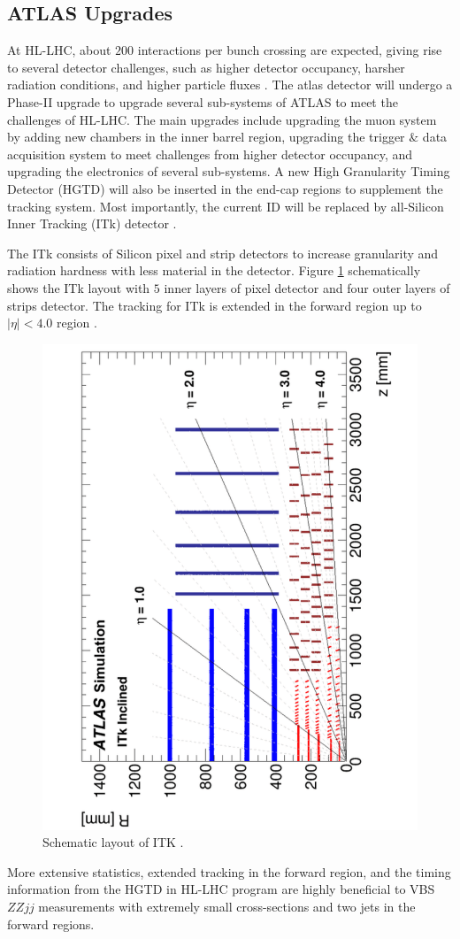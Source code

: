\subsection{ATLAS Upgrades}
\label{subsec:ATLASUpgrade}
At HL-LHC, about $200$ interactions per bunch crossing are expected, giving rise to several detector challenges, such as higher detector occupancy, harsher radiation conditions, and higher particle fluxes \cite{HLLHC}. The atlas detector will undergo a Phase-II upgrade to upgrade several sub-systems of ATLAS to meet the challenges of HL-LHC. The main upgrades include upgrading the muon system by adding new chambers in the inner barrel region, upgrading the trigger $\&$ data acquisition system to meet challenges from higher detector occupancy, and upgrading the electronics of several sub-systems. A new High Granularity Timing Detector (HGTD) will also be inserted in the end-cap regions to supplement the tracking system. Most importantly, the current ID will be replaced by all-Silicon Inner Tracking (ITk) detector \cite{HLLHC}.

The ITk consists of Silicon pixel and strip detectors to increase granularity and radiation hardness with less material in the detector. Figure \ref{fig:ITKLayout} schematically shows the ITk layout with $5$ inner layers of pixel detector and four outer layers of strips detector. The tracking for ITk is extended in the forward region up to $|\eta| < 4.0$ region \cite{ITkStripsTDR}. 

\begin{figure}[!htb]
    \centering
    \includegraphics[angle=270,width=.7\linewidth]{figures/LHC/ITKLayout.pdf}
    \caption{ Schematic layout of ITK \cite{ITkPixelTDR}.\label{fig:ITKLayout}}
\end{figure}

More extensive statistics, extended tracking in the forward region, and the timing information from the HGTD in HL-LHC program are highly beneficial to VBS $ZZjj$ measurements with extremely small cross-sections and two jets in the forward regions. 